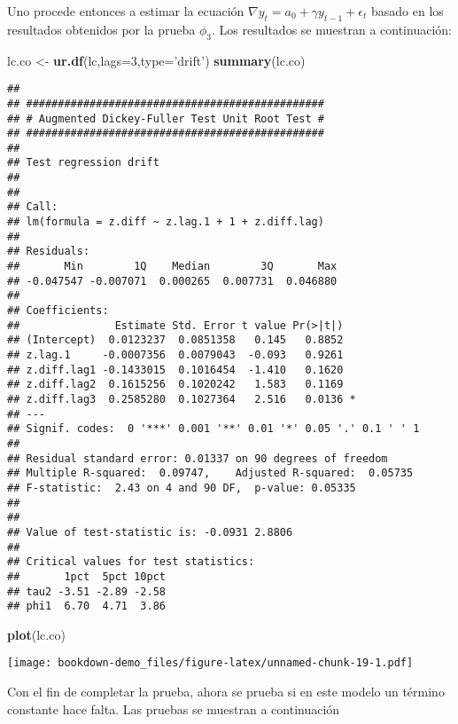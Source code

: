 \documentclass[]{book}
\newenvironment{Shaded}{\begin{snugshade}}{\end{snugshade}}
\newcommand{\KeywordTok}[1]{\textcolor[rgb]{0.13,0.29,0.53}{\textbf{#1}}}
\newcommand{\DataTypeTok}[1]{\textcolor[rgb]{0.13,0.29,0.53}{#1}}
\newcommand{\DecValTok}[1]{\textcolor[rgb]{0.00,0.00,0.81}{#1}}
\newcommand{\StringTok}[1]{\textcolor[rgb]{0.31,0.60,0.02}{#1}}
\newcommand{\NormalTok}[1]{#1}
\theoremstyle{definition}
\theoremstyle{definition}
\theoremstyle{definition}
\theoremstyle{remark}
\begin{document}
Uno procede entonces a estimar la ecuación
\(\nabla y_t = a_0 + \gamma y_{t-1} + \epsilon_t\) basado en los
resultados obtenidos por la prueba \(\phi_3\). Los resultados se
muestran a continuación:

\begin{Shaded}
\begin{Highlighting}[]
\NormalTok{lc.co <-}\StringTok{ }\KeywordTok{ur.df}\NormalTok{(lc,}\DataTypeTok{lags=}\DecValTok{3}\NormalTok{,}\DataTypeTok{type=}\StringTok{'drift'}\NormalTok{)}
\KeywordTok{summary}\NormalTok{(lc.co)}
\end{Highlighting}
\end{Shaded}

\begin{verbatim}
## 
## ############################################### 
## # Augmented Dickey-Fuller Test Unit Root Test # 
## ############################################### 
## 
## Test regression drift 
## 
## 
## Call:
## lm(formula = z.diff ~ z.lag.1 + 1 + z.diff.lag)
## 
## Residuals:
##       Min        1Q    Median        3Q       Max 
## -0.047547 -0.007071  0.000265  0.007731  0.046880 
## 
## Coefficients:
##               Estimate Std. Error t value Pr(>|t|)  
## (Intercept)  0.0123237  0.0851358   0.145   0.8852  
## z.lag.1     -0.0007356  0.0079043  -0.093   0.9261  
## z.diff.lag1 -0.1433015  0.1016454  -1.410   0.1620  
## z.diff.lag2  0.1615256  0.1020242   1.583   0.1169  
## z.diff.lag3  0.2585280  0.1027364   2.516   0.0136 *
## ---
## Signif. codes:  0 '***' 0.001 '**' 0.01 '*' 0.05 '.' 0.1 ' ' 1
## 
## Residual standard error: 0.01337 on 90 degrees of freedom
## Multiple R-squared:  0.09747,    Adjusted R-squared:  0.05735 
## F-statistic:  2.43 on 4 and 90 DF,  p-value: 0.05335
## 
## 
## Value of test-statistic is: -0.0931 2.8806 
## 
## Critical values for test statistics: 
##       1pct  5pct 10pct
## tau2 -3.51 -2.89 -2.58
## phi1  6.70  4.71  3.86
\end{verbatim}

\begin{Shaded}
\begin{Highlighting}[]
\KeywordTok{plot}\NormalTok{(lc.co)}
\end{Highlighting}
\end{Shaded}

\texttt{[image: bookdown-demo\_files/figure-latex/unnamed-chunk-19-1.pdf]}

Con el fin de completar la prueba, ahora se prueba si en este modelo un
término constante hace falta. Las pruebas se muestran a continuación
\end{document}
